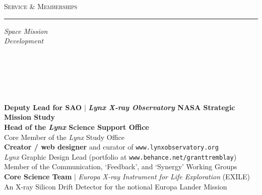 \documentclass[11pt]{article}
\makeatletter
\def\vhrulefill#1{\leavevmode\leaders\hrule\@height#1\hfill \kern\z@}
\makeatother
\begin{document}
\vspace{4mm}

\textsc{Service \& Memberships} \vhrulefill{0.4pt}



\vspace{4mm}

\hspace{2.5mm} \parbox{1.5in}{\textit{Space Mission \\ Development\\\\\\\\\\\\} } \parbox{5.15in}{
\textbf{Deputy Lead for SAO} $|$ \textbf{\textit{Lynx X-ray Observatory} NASA Strategic Mission Study} \\
\textbf{Head of the \textit{Lynx} Science Support Office} \\
Core Member of the \textit{Lynx} Study Office\\
\textbf{Creator / web designer} and curator of \small \texttt{www.lynxobservatory.org} \\
\textit{Lynx} Graphic Design Lead (portfolio at {\small \texttt{www.behance.net/granttremblay}})\\
Member of the Communication, `Feedback', and `Synergy' Working Groups\\


\textbf{Core Science Team} $|$ \textit{Europa X-ray Instrument for Life Exploration} (EXILE)\\
An X-ray Silicon Drift Detector for the notional Europa Lander Mission} \\


\vspace{4mm}
\end{document}
